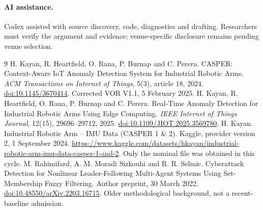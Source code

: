 \documentclass[11pt]{article}
\begin{document}
\paragraph{AI assistance.} Codex assisted with source discovery, code, diagnostics and drafting. Researchers must verify the argument and evidence; venue-specific disclosure remains pending venue selection.

\begin{thebibliography}{9}
 H. Kayan, R. Heartfield, O. Rana, P. Burnap and C. Perera.
CASPER: Context-Aware IoT Anomaly Detection System for Industrial Robotic Arms.
\emph{ACM Transactions on Internet of Things}, 5(3), article 18, 2024.
\href{https://doi.org/10.1145/3670414}{doi:10.1145/3670414}.
Corrected VOR V1.1, 5 February 2025.
 H. Kayan, R. Heartfield, O. Rana, P. Burnap and C. Perera.
Real-Time Anomaly Detection for Industrial Robotic Arms Using Edge Computing.
\emph{IEEE Internet of Things Journal}, 12(15), 29696--29712, 2025.
\href{https://doi.org/10.1109/JIOT.2025.3569780}{doi:10.1109/JIOT.2025.3569780}.
 H. Kayan. Industrial Robotic Arm -- IMU Data (CASPER 1 \& 2).
Kaggle, provider version 2, 1 September 2024.
\url{https://www.kaggle.com/datasets/hkayan/industrial-robotic-arm-imu-data-casper-1-and-2}.
Only the nominal file was obtained in this cycle.
 M. Rahimifard, A. M. Moradi Sizkouhi and R. R. Selmic.
Cyberattack Detection for Nonlinear Leader-Following Multi-Agent Systems Using Set-Membership Fuzzy Filtering.
Author preprint, 30 March 2022.
\href{https://doi.org/10.48550/arXiv.2203.16715}{doi:10.48550/arXiv.2203.16715}.
Older methodological background, not a recent-baseline admission.
\end{thebibliography}
\end{document}
